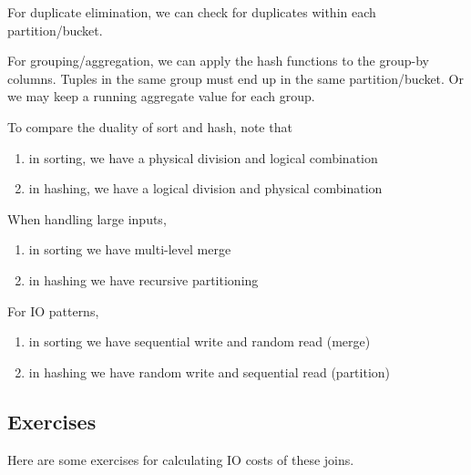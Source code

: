    For duplicate elimination, we can check for duplicates within each partition/bucket. 

    For grouping/aggregation, we can apply the hash functions to the group-by columns. Tuples in the same group must end up in the same partition/bucket. Or we may keep a running aggregate value for each group. 

    To compare the duality of sort and hash, note that 
    \begin{enumerate}
      \item in sorting, we have a physical division and logical combination 
      \item in hashing, we have a logical division and physical combination
    \end{enumerate}
    When handling large inputs, 
    \begin{enumerate}
      \item in sorting we have multi-level merge 
      \item in hashing we have recursive partitioning 
    \end{enumerate}
    For IO patterns, 
    \begin{enumerate}
      \item in sorting we have sequential write and random read (merge) 
      \item in hashing we have random write and sequential read (partition) 
    \end{enumerate}

\subsection{Exercises} 

  Here are some exercises for calculating IO costs of these joins. 

